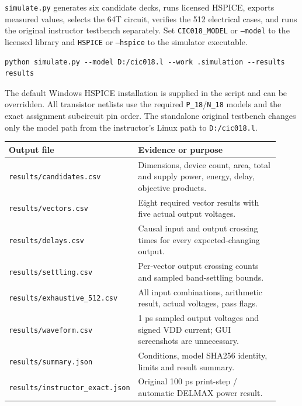 \documentclass[11pt,a4paper]{article}
\begin{document}
\texttt{simulate.py} generates six candidate decks, runs licensed HSPICE,
exports measured values, selects the 64T circuit, verifies the 512 electrical
cases, and runs the original instructor testbench separately. Set
\texttt{CIC018\_MODEL} or \texttt{--model} to the licensed library and
\texttt{HSPICE} or \texttt{--hspice} to the simulator executable.
\begin{verbatim}
python simulate.py --model D:/cic018.l --work .simulation --results results
\end{verbatim}
The default Windows HSPICE installation is supplied in the script and can
be overridden. All transistor netlists use the required
\texttt{P\_18}/\texttt{N\_18} models and the exact assignment subcircuit pin order.
The standalone original testbench changes only the model path from the
instructor's Linux path to \texttt{D:/cic018.l}.

\begin{center}\small
\begin{tabular}{p{0.35\linewidth}p{0.57\linewidth}}\toprule
Output file & Evidence or purpose\\\midrule
\texttt{results/candidates.csv} & Dimensions, device count, area, total and supply power, energy, delay, objective products.\\
\texttt{results/vectors.csv} & Eight required vector results with five actual output voltages.\\
\texttt{results/delays.csv} & Causal input and output crossing times for every expected-changing output.\\
\texttt{results/settling.csv} & Per-vector output crossing counts and sampled band-settling bounds.\\
\texttt{results/exhaustive\_512.csv} & All input combinations, arithmetic result, actual voltages, pass flags.\\
\texttt{results/waveform.csv} & 1 ps sampled output voltages and signed VDD current; GUI screenshots are unnecessary.\\
\texttt{results/summary.json} & Conditions, model SHA256 identity, limits and result summary.\\
\texttt{results/instructor\_exact.json} & Original 100 ps print-step / automatic DELMAX power result.\\\bottomrule
\end{tabular}\end{center}

\newpage
\end{document}
